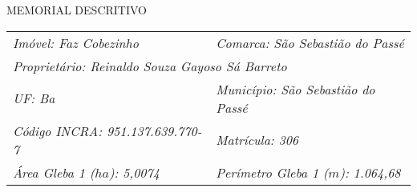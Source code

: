 \begin{center}
	\LARGE {MEMORIAL DESCRITIVO}
\end{center}
\begin{tabular}{ll}
\emph{Imóvel: Faz Cobezinho} & \emph{Comarca: São Sebastião do Passé} \\
\multicolumn{2}{l}{\emph{Proprietário: Reinaldo Souza Gayoso Sá Barreto}}\\
\emph{UF: Ba }& \emph{Município: São Sebastião do Passé }\\
\emph{Código INCRA: 951.137.639.770-7}\hspace{3cm}	 & \emph{Matrícula: 306 }\\
\emph{Área Gleba 1 ($ha$): 5,0074} & \emph{Perímetro Gleba 1 ($m$): 1.064,68}\\	
\end{tabular}
